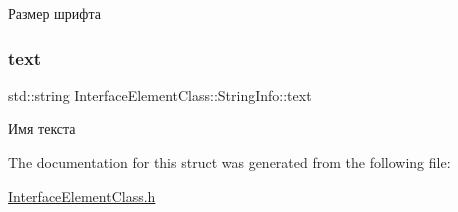 Размер шрифта 

\mbox{\label{struct_interface_element_class_1_1_string_info_a6f6499237752c482c74d9576df4c0da5}} 
\subsubsection{\texorpdfstring{text}{text}}
{\footnotesize\ttfamily std\+::string Interface\+Element\+Class\+::\+String\+Info\+::text}



Имя текста 



The documentation for this struct was generated from the following file\+:\begin{DoxyCompactItemize}
\item 
\hyperlink{_interface_element_class_8h}{Interface\+Element\+Class.\+h}\end{DoxyCompactItemize}
